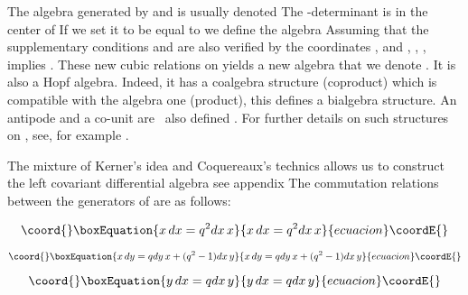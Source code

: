 \documentclass[a4paper,12pt,thmsa]{article}
\begin{document}
The algebra generated by \coordHE{} and \coordHE{} is usually denoted \coordHE{} The \coordHE{}-determinant \coordHE{} is in the center of \coordHE{} If we set it to be equal to \coordHE{} we define the algebra \coordHE{} Assuming that the supplementary conditions \coordHE{} and \coordHE{} are also verified by the coordinates \coordHE{}, \coordHE{}  \myHighlight{$($}\coordHE{}and \coordHE{},
\coordHE{}, \myHighlight{$($}\coordHE{}  \coordHE{}, \coordHE{} implies \coordHE{}  \coordHE{}  \coordHE{}  \coordHE{}. These new cubic relations on \coordHE{}
yields a new algebra that we denote \coordHE{}. It is also a Hopf algebra. Indeed,
it has a coalgebra structure (coproduct) which is compatible with the
algebra one (product), this defines a bialgebra structure. An antipode and a
co-unit are ~also defined . For further details on such structures on \coordHE{},
see, for example \myHighlight{$[6]$}\coordHE{}.

The mixture of Kerner's idea and Coquereaux's technics allows us to
construct the left covariant differential algebra \coordHE{}  \coordHE{}  \coordHE{}  \coordHE{}  \coordHE{}  \coordHE{} see appendix\coordHE{} The commutation relations between the
generators of \myHighlight{$\Omega $}\coordHE{} are as follows:

\begin{equation}\coord{}\boxEquation{
x\, dx=q^{2}dx\, x
}{
x\, dx=q^{2}dx\, x
}{ecuacion}\coordE{}\end{equation}

\begin{equation}\coord{}\boxEquation{
x\, dy=qdy\, x+(q^2-1)dx\, y
}{
x\, dy=qdy\, x+(q^2-1)dx\, y
}{ecuacion}\coordE{}\end{equation}

\begin{equation}\coord{}\boxEquation{
y\, dx=qdx\, y
}{
y\, dx=qdx\, y
}{ecuacion}\coordE{}\end{equation}
\end{document}
